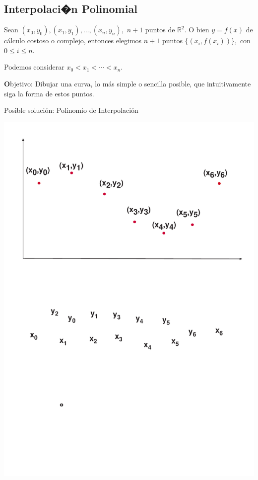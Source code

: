 \documentclass[ebook,oneside]{memoir}
\begin{document}
\subsection{Interpolaci�n Polinomial}

Sean $(x_0,y_0), (x_1,y_1),\ldots,(x_n,y_n),$ $n+1$ puntos de $\mathbb{R}^2.$ O bien $y=f(x)$ de c\'{a}lculo costoso o complejo, entonces elegimos $n+1$ puntos $\{(x_i,f(x_i))\},$ con $0\leq i\leq n.$

Podemos considerar $x_0<x_1<\cdots <x_n$.

{\textbf Objetivo:} Dibujar una curva, lo m\'{a}s simple o sencilla posible, que intuitivamente siga la forma de  estos puntos.

Posible soluci\'{o}n: Polinomio de Interpolaci\'{o}n

\begin{center}
        \includegraphics[scale=0.55]{puntos.pdf}
\end{center}
\end{document}
